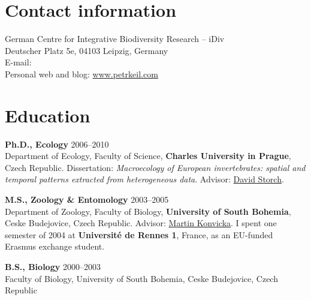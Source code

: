 
\usepackage{wasysym}





\thispagestyle{empty}

\section{Contact information}

	German Centre for Integrative Biodiversity Research -- iDiv \\
	Deutscher Platz 5e,  04103 Leipzig, Germany\\
    E-mail: \\
    Personal web and blog: \href{http://www.petrkeil.com}	{www.petrkeil.com}\\

\HRule

\section{Education}

\begin{innerlist}

\item[]{\bf  Ph.D., Ecology} 
\hfill {2006--2010} \\
Department of Ecology, Faculty of Science, {\bf Charles University in Prague}, Czech Republic. Dissertation: \textit{Macroecology of European invertebrates: spatial and temporal patterns extracted from heterogeneous data}. Advisor: \href{http://www.cts.cuni.cz/~storch/}{David Storch}.\\

\item[]{\bf  M.S., Zoology \& Entomology} 
\hfill {2003--2005} \\
Department of Zoology, Faculty of Biology, {\bf University of South Bohemia}, Ceske Budejovice, Czech Republic. Advisor: \href{http://www.entu.cas.cz/en/staff/Martin-Konvicka-r81r/?all_publications=show}{Martin Konvicka}. I spent one semester of 2004 at {\bf Universit\'{e} de Rennes 1}, France, as an EU-funded Erasmus exchange student.\\ 

\item[]{\bf  B.S., {Biology}} 
\hfill {2000--2003} \\
Faculty of Biology, University of South Bohemia, Ceske Budejovice, Czech Republic\\

\end{innerlist}

